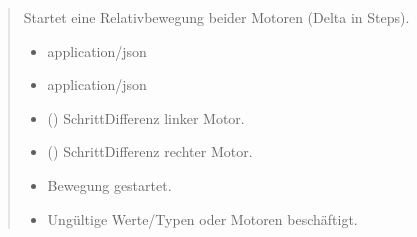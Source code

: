\documentclass[letterpaper,10pt,english]{sphinxmanual}
\begin{document}
\begin{fulllineitems}
\label{\detokenize{agv_rest_api_stepper:post--api-agv-stepper-setMoveRelative}}
\pysigstartsignatures
\pysigline
{}
\pysigstopsignatures\begin{quote}\begin{description}
\sphinxAtStartPar
Startet eine Relativbewegung beider Motoren (Delta in Steps).

\begin{itemize}
\item {} 
\sphinxAtStartPar
{} \textendash{} application/json

\end{itemize}

\begin{itemize}
\item {} 
\sphinxAtStartPar
{} \textendash{} application/json

\end{itemize}

\begin{itemize}
\item {} 
\sphinxAtStartPar
{} () \textendash{} Schritt\sphinxhyphen{}Differenz linker Motor.

\item {} 
\sphinxAtStartPar
{} () \textendash{} Schritt\sphinxhyphen{}Differenz rechter Motor.

\end{itemize}

\begin{itemize}
\item {} 
\sphinxAtStartPar
{} \textendash{} Bewegung gestartet.

\item {} 
\sphinxAtStartPar
{} \textendash{} Ungültige Werte/Typen oder Motoren beschäftigt.

\end{itemize}

\end{description}\end{quote}

\end{fulllineitems}
\end{document}
